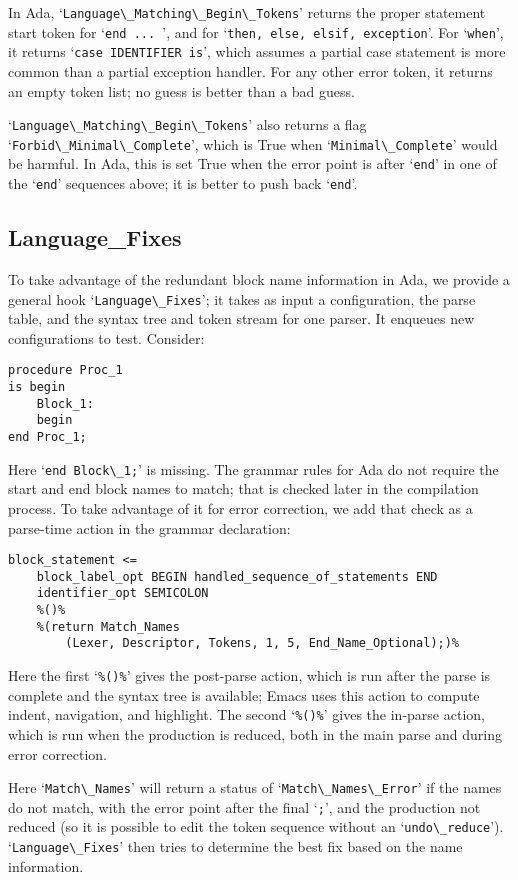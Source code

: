 \documentclass[authordraft]{acmart}
\newcommand{\code}[1]{`\lstinline|#1|'}
\begin{document}
In Ada, \code{Language\_Matching\_Begin\_Tokens} returns the proper
statement start token for \code{end ... }, and for
\code{then, else, elsif, exception}. For \code{when}, it returns
\code{case IDENTIFIER is}, which assumes a partial case statement is
more common than a partial exception handler. For any other error
token, it returns an empty token list; no guess is better than a bad
guess.

\code{Language\_Matching\_Begin\_Tokens} also returns a flag\\
\code{Forbid\_Minimal\_Complete}, which is True when
\code{Minimal\_Complete} would be harmful. In Ada, this is set True
when the error point is after \code{end} in one of the \code{end}
sequences above; it is better to push back \code{end}.

\subsection{Language\_Fixes}
To take advantage of the redundant block name information in Ada, we
provide a general hook \code{Language\_Fixes}; it takes as input a
configuration, the parse table, and the syntax tree and token stream
for one parser. It enqueues new configurations to test. Consider:
\begin{lstlisting}
procedure Proc_1
is begin
    Block_1:
    begin
end Proc_1;
\end{lstlisting}
Here \code{end Block\_1;} is missing. The grammar rules for Ada do not
require the start and end block names to match; that is checked later
in the compilation process. To take advantage of it for error
correction, we add that check as a parse-time action in the grammar
declaration:
\begin{verbatim}
block_statement <=
    block_label_opt BEGIN handled_sequence_of_statements END
    identifier_opt SEMICOLON
    %()%
    %(return Match_Names
        (Lexer, Descriptor, Tokens, 1, 5, End_Name_Optional);)%
\end{verbatim}
Here the first `\verb|%()%|' gives the post-parse action, which is run
after the parse is complete and the syntax tree is available; Emacs
uses this action to compute indent, navigation, and highlight. The
second `\verb|%()%|' gives the in-parse action, which is run when the
production is reduced, both in the main parse and during error
correction.

Here \code{Match\_Names} will return a status of
\code{Match\_Names\_Error} if the names do not match, with the error
point after the final \code{;}, and the production not reduced (so it
is possible to edit the token sequence without an
\code{undo\_reduce}). \code{Language\_Fixes} then tries to determine
the best fix based on the name information.
\end{document}
